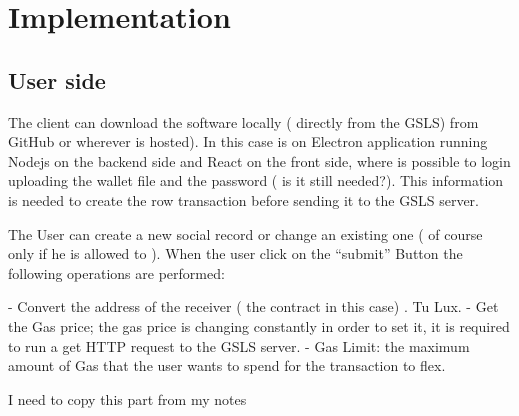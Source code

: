 \chapter{Implementation}
\label{implementation}


\section{User side}

The client can download the software locally ( directly from the GSLS) from GitHub or wherever is hosted).
In this case is on Electron application running Nodejs on the backend side and React on the front side, where is possible to login uploading the wallet file and the password ( is it still needed?).
This information is needed to create the row transaction before sending it to the GSLS server.

The User can create a new social record or change an existing one ( of course only if he is allowed to ).
When the user click on the “submit” Button the following operations are performed:

- Convert the address of the receiver ( the contract in this case) . Tu Lux.
- Get the Gas price; the gas price is changing constantly in order to set it, it is required to run a get HTTP request to the GSLS server.
- Gas Limit: the maximum amount of Gas that the user wants to spend for the transaction to flex.

\begin{notation}
  I need to copy this part from my notes
\end{notation}
